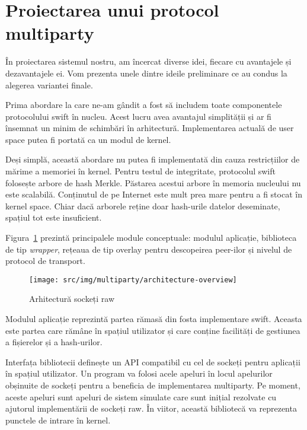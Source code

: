 \section{Proiectarea unui protocol multiparty}
\label{sec:multiparty:design}

În proiectarea sistemul nostru, am încercat diverse idei, fiecare cu
avantajele și dezavantajele ei. Vom prezenta unele dintre ideile
preliminare ce au condus la alegerea variantei finale.

Prima abordare la care ne-am gândit a fost să includem toate componentele
protocolului swift în nucleu. Acest lucru avea avantajul simplității și ar
fi însemnat un minim de schimbări în arhitectură. Implementarea actuală de
user space putea fi portată ca un modul de kernel.

Deși simplă, această abordare nu putea fi implementată din cauza
restricțiilor de mărime a memoriei în kernel. Pentru testul de integritate,
protocolul swift folosește arbore de hash Merkle. Păstarea acestui arbore
în memoria nucleului nu este scalabilă. Conținutul de pe Internet este mult
prea mare pentru a fi stocat în kernel space. Chiar dacă arborele reține
doar hash-urile datelor deseminate, spațiul tot este insuficient.

Figura~\ref{fig:multiparty:architecture-overview} prezintă principalele module
conceptuale: modulul aplicație, biblioteca de tip \textit{wrapper}, rețeaua de
tip overlay pentru descopeirea peer-ilor și nivelul de protocol de transport.

\begin{figure}
  \centering
  \texttt{[image: src/img/multiparty/architecture-overview]}
  \caption{Arhitectură sockeți raw}
  \label{fig:multiparty:architecture-overview}
\end{figure}

Modulul aplicație reprezintă partea rămasă din fosta implementare swift. Aceasta
este partea care rămâne în spațiul utilizator și care conține facilități de
gestiunea a fișierelor și a hash-urilor.

Interfața bibliotecii definește un API compatibil cu cel de sockeți pentru
aplicații în spațiul utilizator. Un program va folosi acele apeluri în locul
apelurilor obșinuite de sockeți pentru a beneficia de implementarea
multiparty. Pe moment, aceste apeluri sunt apeluri de sistem simulate care
sunt inițial rezolvate cu ajutorul implementării de sockeți raw. În viitor,
această bibliotecă va reprezenta punctele de intrare în kernel.

